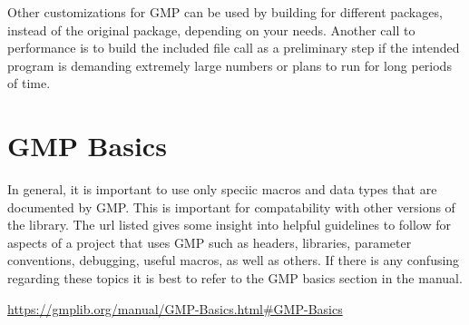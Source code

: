 Other customizations for GMP can be used by building for different packages, instead of the original package, depending on your needs.
Another call to performance is to build the included file call  as a preliminary step if the intended program is demanding extremely large numbers or plans to run for long periods of time.


\section{GMP Basics}

In general, it is important to use only speciic macros and data types that are documented by GMP. This is important for
compatability with other versions of the library. The url listed gives some insight into helpful guidelines to follow
for aspects of a project that uses GMP such as headers, libraries, parameter conventions, debugging, useful macros, as well as others.
If there is any confusing regarding these topics it is best to refer to the GMP basics section in the manual.

\url{https://gmplib.org/manual/GMP-Basics.html#GMP-Basics}

